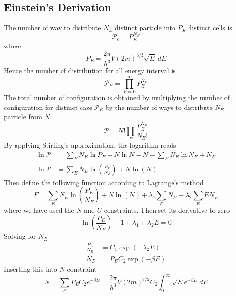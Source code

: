 \documentclass[../../../Main.tex]{subfiles}
\begin{document}
\subsection{Einstein's Derivation}
The number of way to distribute $N_E$ distinct particle into $P_E$ distinct cells is 
\begin{equation*}
    \mathcal{P}_e=P_E^{N_E}
\end{equation*}
where
\begin{equation*}
    P_E=\frac{2\pi}{h^3}V(2m)^{3/2}\sqrt{E}\;dE
\end{equation*}
Hence the number of distribution for all energy interval is 
\begin{equation*}
    \mathcal{P}_E=\prod_{E=0}^{\infty}P_E^{N_E}
\end{equation*}
The total number of configuration is obtained by multiplying the number of configuration for distinct case $\mathcal{P}_E$ by the number of ways to distribute $N_E$ particle from $N$
\begin{equation*}
    \mathcal{P}=N! \prod_{E} \frac{P_E^{N_E}}{N_E!}
\end{equation*}
By applying Stirling's approximation, the logarithm reads
\begin{align*}
    \ln \mathcal{P}&=\sum_E N_E \ln P_E+ N\ln N -N-\sum_E N_E \ln N_E+ N_E\\
    \ln \mathcal{P}&=\sum_E N_E \ln \left(\frac{P_E}{N_E}\right)+ N\ln (N)
\end{align*} 
Then define the following function according to Lagrange's method
\begin{equation*}
    F=\sum_E N_E \ln \left(\frac{P_E}{N_E}\right)+ N\ln (N) +\lambda_1\sum_E N_E +\lambda_2\sum_E EN_E
\end{equation*}
where we have used the $N$ and $U$ constraints. Then set its derivative to zero 
\begin{equation*}
    \ln \left(\frac{P_E}{N_E}\right)-1+\lambda_1+\lambda_2E=0
\end{equation*}
Solving for $N_E$
\begin{align*}
    \frac{P_E }{N_E}&=C_1\exp\left(-\lambda_2E\right)\\
    N_E&=P_E C_2 \exp\left(-\beta E\right)
\end{align*}
Inserting this into $N$ constraint
\begin{equation*}
    N=\sum_E P_E C_2 e^{-\beta E}= \frac{2\pi}{h^3}V(2m)^{3/2} C_2\int_{0}^{\infty} \sqrt{E}e^{-\beta E}\;dE
\end{equation*}
\end{document}
